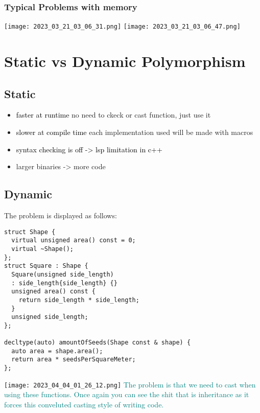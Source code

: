 \documentclass[main.tex,fontsize=8pt,paper=a4,paper=portrait,DIV=calc,]{scrartcl}
\begin{document}
\subsubsection{Typical Problems with memory}
\texttt{[image: 2023\_03\_21\_03\_06\_31.png]}\newline
\texttt{[image: 2023\_03\_21\_03\_06\_47.png]}

\section{Static vs Dynamic Polymorphism}
\subsection{Static}
\begin{itemize}
\item \textcolor{black}{faster at runtime}\newline
  no need to ckeck or cast function, just use it
\item \textcolor{black}{slower at compile time }\newline
  each implementation used will be made with macros
\item \textcolor{black}{syntax checking is off -> lsp limitation in c++}
\item larger binaries -> more code
\end{itemize} 

\subsection{Dynamic}
The problem is displayed as follows: 
\begin{lstlisting}
struct Shape {
  virtual unsigned area() const = 0;
  virtual ~Shape();
};
struct Square : Shape {
  Square(unsigned side_length)
  : side_length{side_length} {}
  unsigned area() const {
    return side_length * side_length;
  }
  unsigned side_length;
};

decltype(auto) amountOfSeeds(Shape const & shape) {
  auto area = shape.area();
  return area * seedsPerSquareMeter;
};
\end{lstlisting}
\texttt{[image: 2023\_04\_04\_01\_26\_12.png]}\newline
\textcolor{teal}{The problem is that we need to cast when using these functions. 
Once again you can see the shit that is inheritance as it forces this conveluted casting style of writing code.}
\end{document}
